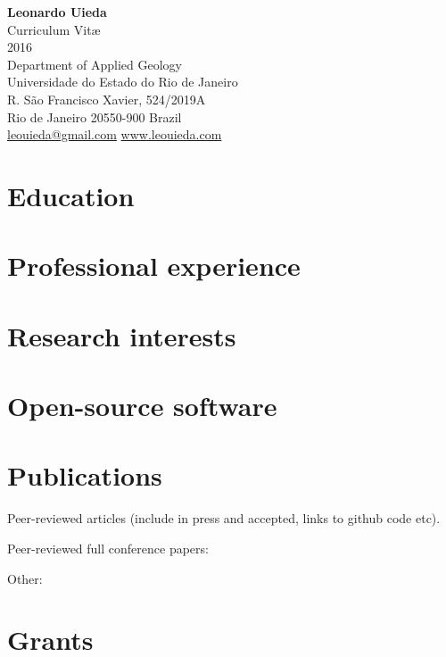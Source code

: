 \documentclass[12pt]{article}
\begin{document}
\thispagestyle{empty}
\begin{center}
    \textbf{\LARGE Leonardo Uieda}
    \\\vspace{0.3cm}
    {\large Curriculum Vit\ae}
    \\\vspace{0.3cm}
    {\large 2016}
    \\\vspace{0.3cm}
    Department of Applied Geology\\
    Universidade do Estado do Rio de Janeiro\\
    R. São Francisco Xavier, 524/2019A\\
    Rio de Janeiro 20550-900 Brazil
    \\\vspace{0.3cm}
    \href{mailto:leouieda@gmail.com}{leouieda@gmail.com} \hspace{2cm}
    \href{http://www.leouieda.com}{www.leouieda.com}
\end{center}


\section*{Education}


\section*{Professional experience}

\section*{Research interests}

\section*{Open-source software}

\section*{Publications}

Peer-reviewed articles (include in press and accepted, links to github code
etc).

Peer-reviewed full conference papers:

Other:


\section*{Grants}
\end{document}
